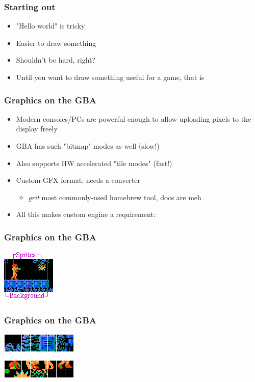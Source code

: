\documentclass{beamer}
\begin{document}
\begin{frame}
	\frametitle{Starting out}
	\begin{itemize}
		\item "Hello world" is tricky
		\item Easier to draw something
		\item Shouldn't be hard, right?
		\item Until you want to draw something useful for a game, that is
	\end{itemize}
\end{frame}

\begin{frame}
	\frametitle{Graphics on the GBA}
	\begin{itemize}
		\item Modern consoles/PCs are powerful enough to allow uploading pixels to the display freely
		\item GBA has such "bitmap" modes as well (slow!)
		\item Also supports HW accelerated "tile modes" (fast!)
		\item Custom GFX format, needs a converter \begin{itemize}
			      \item \emph{grit} most commonly-used homebrew tool, docs are meh
		      \end{itemize}
		\item All this makes custom engine a requirement:
	\end{itemize}
\end{frame}

\begin{frame}
	\frametitle{Graphics on the GBA}
	\includegraphics[scale=2.0]{images/tile_gfx_render.png}
\end{frame}

\begin{frame}
	\frametitle{Graphics on the GBA}
	\includegraphics[scale=2.0]{images/tile_gfx_tileset.png}
\end{frame}
\end{document}
